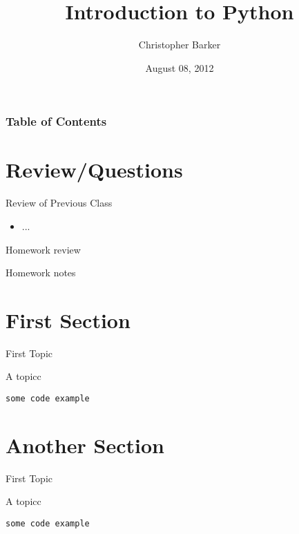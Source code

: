 \documentclass{beamer}
\title[Intro to Python: Week 7]{Introduction  to Python}
\author{Christopher Barker}
\institute{UW Continuing Education / Isilon}
\date{August 08, 2012}
\begin{document}
\begin{frame}
  \titlepage
\end{frame}

\begin{frame}
\frametitle{Table of Contents}
  \tableofcontents
\end{frame}


\section{Review/Questions}

\begin{frame}{Review of Previous Class}

\begin{itemize}
  \item ...
\end{itemize}

\end{frame}


\begin{frame}{Homework review}

  {\Large Homework notes }

\end{frame}

\section{First Section}

\begin{frame}[fragile]{First Topic}

 {\Large A topicc}

\begin{verbatim}
some code example
\end{verbatim}

\end{frame} 

\section{Another Section}

\begin{frame}[fragile]{First Topic}

 {\Large A topicc}

\begin{verbatim}
some code example
\end{verbatim}

\end{frame} 
\end{document}
